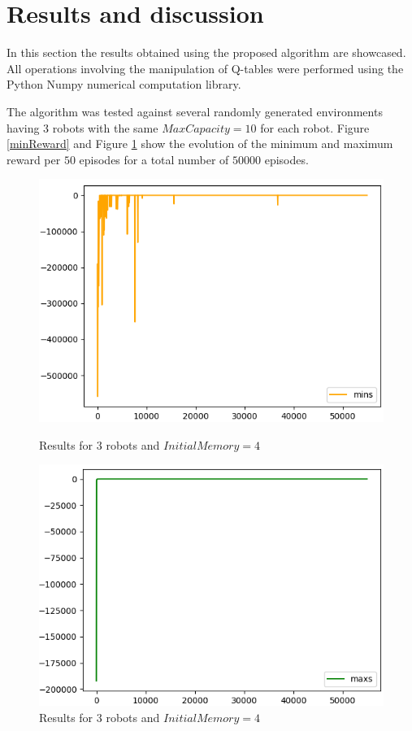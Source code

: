 \section{Results and discussion}
In this section the results obtained using the proposed algorithm are showcased. All operations involving the manipulation of Q-tables were performed using the Python Numpy \cite{numpy} numerical computation library.
\par The algorithm was tested against several randomly generated environments having 3 robots with the same $MaxCapacity=10$ for each robot. Figure \ref{minReward} and Figure \ref{maxReward} show the evolution of the minimum and maximum reward per $50$ episodes for a total number of $50000$ episodes.
\begin{figure}[!htb]
\begin{minipage}{0.5\linewidth}
\centering
  \includegraphics[scale=0.5]{Figures/minsBigEnv.png}
  \caption{Results for $3$ robots and $InitialMemory=4$}
  \label{minReward}
\end{minipage}
\hfill
\begin{minipage}{0.5\linewidth}
\centering
  \includegraphics[scale=0.5]{Figures/maxBigEnv.png}
  \caption{Results for $3$ robots and $InitialMemory=4$}
  \label{maxReward}
\end{minipage}
\end{figure}

